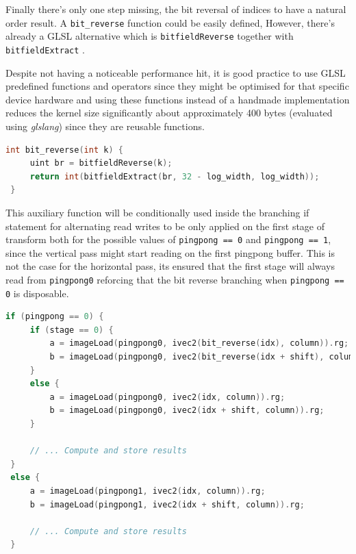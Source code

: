 \documentclass[
  oneside,
  11pt, a4paper,
  footinclude=true,
  headinclude=true,
  cleardoublepage=empty
]{scrbook}
\begin{document}
Finally there's only one step missing, the bit reversal of indices to have a natural order result. A \texttt{bit\_reverse} function could be easily defined, However, there's already a GLSL alternative which is \texttt{bitfieldReverse} together with \texttt{bitfieldExtract} \cite{kessenich4opengl}.

Despite not having a noticeable performance hit, it is good practice to use GLSL predefined functions and operators since they might be optimised for that specific device hardware and using these functions instead of a handmade implementation reduces the kernel size significantly about approximately 400 bytes (evaluated using \textit{glslang}) since they are reusable functions. 

\begin{lstlisting}[language=C,label={Auxiliary function that take advantage of GLSL's predefined utilities}]
 int bit_reverse(int k) {
     uint br = bitfieldReverse(k);
     return int(bitfieldExtract(br, 32 - log_width, log_width));
 }
\end{lstlisting}

This auxiliary function will be conditionally used inside the branching if statement for alternating read writes to be only applied on the first stage of transform both for the possible values of \texttt{pingpong == 0} and \texttt{pingpong == 1}, since the vertical pass might start reading on the first pingpong buffer. This is not the case for the horizontal pass, its ensured that the first stage will always read from \texttt{pingpong0} reforcing that the bit reverse branching when \texttt{pingpong == 0} is disposable.

\begin{lstlisting}[language=C,label={Computation of the Cooley-Tukey butterfly with bit reversal}]
 if (pingpong == 0) {
     if (stage == 0) {
         a = imageLoad(pingpong0, ivec2(bit_reverse(idx), column)).rg;
         b = imageLoad(pingpong0, ivec2(bit_reverse(idx + shift), column)).rg;
     }
     else {
         a = imageLoad(pingpong0, ivec2(idx, column)).rg;
         b = imageLoad(pingpong0, ivec2(idx + shift, column)).rg;
     }

     // ... Compute and store results
 }
 else {
     a = imageLoad(pingpong1, ivec2(idx, column)).rg;
     b = imageLoad(pingpong1, ivec2(idx + shift, column)).rg;

     // ... Compute and store results
 }
\end{lstlisting}
\end{document}
